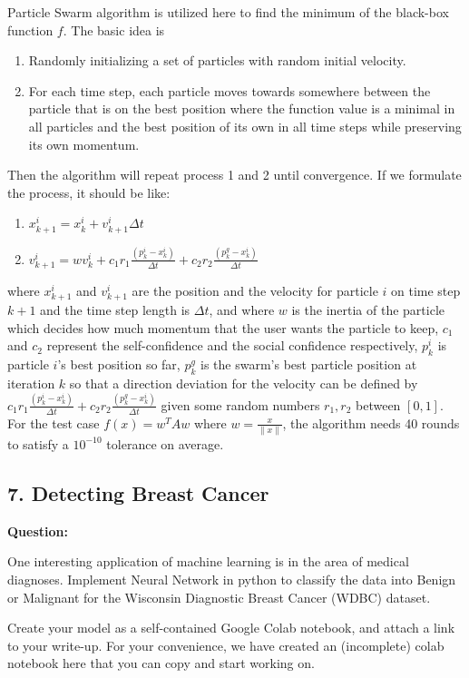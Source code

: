 \documentclass[a4paper]{article}
\begin{document}
Particle Swarm algorithm is utilized here to find the minimum of the black-box function $f$. The basic idea is
\begin{enumerate}
    \item Randomly initializing a set of particles with random initial velocity.
    \item For each time step, each particle moves towards somewhere between the particle that is on the best position where the function value is a minimal in all particles and the best position of its own in all time steps while preserving its own momentum.
\end{enumerate}
Then the algorithm will repeat process 1 and 2 until convergence. If we formulate the process, it should be like:
\begin{enumerate}
    \item $x_{k+1}^{i}=x_{k}^{i}+v_{k+1}^{i} \Delta t$
    \item $v_{k+1}^{i}=w v_{k}^{i}+c_{1} r_{1} \frac{\left(p_{k}^{i}-x_{k}^{i}\right)}{\Delta t}+c_{2} r_{2} \frac{\left(p_{k}^{g}-x_{k}^{i}\right)}{\Delta t}$
\end{enumerate}
where $x_{k+1}^{i}$ and $v_{k+1}^{i}$ are the position and the velocity for particle $i$ on time step $k+1$ and the time step length is $\Delta t$, and where $w$ is the inertia of the particle which decides how much momentum that the user wants the particle to keep, $c_1$ and $c_2$ represent the self-confidence and the social confidence respectively, $p_{k}^{i}$ is particle $i$’s best position so far, $p_k^g$ is the swarm’s best particle position at iteration $k$ so that a direction deviation for the velocity can be defined by $c_{1} r_{1} \frac{\left(p_{k}^{i}-x_{k}^{i}\right)}{\Delta t}+c_{2} r_{2} \frac{\left(p_{k}^{g}-x_{k}^{i}\right)}{\Delta t}$ given some random numbers $r_1, r_2$ between $[0,1]$. For the test case $f(x)=w^T A w$ where $w = \frac{x}{\lVert x \rVert}$, the algorithm needs 40 rounds to satisfy a $10^{-10}$ tolerance on average.
\subsection*{7. Detecting Breast Cancer}
\textbf{Question:}

One interesting application of machine learning is in the area of medical diagnoses. Implement Neural Network in python to classify the data into Benign or Malignant for the Wisconsin Diagnostic Breast Cancer (WDBC) dataset. 

Create your model as a self-contained Google Colab notebook, and attach a link to your write-up. For your convenience, we have created an (incomplete) colab notebook here that you can copy and start working on.
\end{document}
